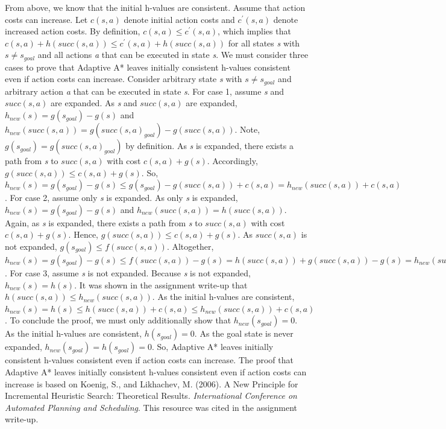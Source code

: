 \documentclass{article}
\begin{document}
From above, we know that the initial h-values are consistent. Assume that action costs can increase. Let $c(s,a)$ denote initial action costs and $c^{'}(s,a)$ denote increased action costs. By definition, $c(s,a) \leq c^{'}(s,a)$, which implies that $c(s,a) + h(succ(s,a)) \leq c^{'}(s,a) + h(succ(s,a))$ for all states \textit{s} with $s \neq s_{goal}$ and all actions \textit{a} that can be executed in state \textit{s}. We must consider three cases to prove that Adaptive A* leaves initially consistent h-values consistent even if action costs can increase. Consider arbitrary state \textit{s} with $s \neq s_{goal}$ and arbitrary action \textit{a} that can be executed in state \textit{s}. For case 1, assume \textit{s} and $succ(s,a)$ are expanded. As \textit{s} and $succ(s,a)$ are expanded, $h_{new}(s) = g(s_{goal}) - g(s)$ and $h_{new}(succ(s,a)) = g(succ(s,a)_{goal}) - g(succ(s,a))$. Note, $g(s_{goal}) = g(succ(s,a)_{goal})$ by definition. As \textit{s} is expanded, there exists a path from \textit{s} to $succ(s,a)$ with cost $c(s,a) + g(s)$. Accordingly, $g(succ(s,a)) \leq c(s,a) + g(s)$. So, $h_{new}(s) = g(s_{goal}) - g(s) \leq g(s_{goal}) - g(succ(s,a)) + c(s,a) = h_{new}(succ(s,a)) + c(s,a)$. For case 2, assume only \textit{s} is expanded. As only \textit{s} is expanded, $h_{new}(s) = g(s_{goal}) - g(s)$ and $h_{new}(succ(s,a)) = h(succ(s,a))$. Again, as \textit{s} is expanded, there exists a path from \textit{s} to $succ(s,a)$ with cost $c(s,a) + g(s)$. Hence, $g(succ(s,a)) \leq c(s,a) + g(s)$. As $succ(s,a)$ is not expanded, $g(s_{goal}) \leq f(succ(s,a))$. Altogether, $h_{new}(s) = g(s_{goal}) - g(s) \leq f(succ(s,a)) - g(s) = h(succ(s,a)) + g(succ(s,a)) - g(s) = h_{new}(succ(s,a)) + g(succ(s,a)) - g(s) \leq h_{new}(succ(s,a)) + g(succ(s,a)) - g(succ(s,a)) + c(s,a) = h_{new}(succ(s,a)) + c(s,a)$. For case 3, assume \textit{s} is not expanded. Because \textit{s} is not expanded, $h_{new}(s) = h(s)$. It was shown in the assignment write-up that $h(succ(s,a)) \leq h_{new}(succ(s,a))$. As the initial h-values are consistent, $h_{new}(s) = h(s) \leq h(succ(s,a)) + c(s,a) \leq h_{new}(succ(s,a)) + c(s,a)$. To conclude the proof, we must only additionally show that $h_{new}(s_{goal}) = 0$. As the initial h-values are consistent, $h(s_{goal}) = 0$. As the goal state is never expanded, $h_{new}(s_{goal}) = h(s_{goal}) = 0$. So, Adaptive A* leaves initially consistent h-values consistent even if action costs can increase.
\newline
\newline
\noindent
The proof that Adaptive A* leaves initially consistent h-values consistent even if action costs can increase is based on Koenig, S., and Likhachev, M. (2006). A New Principle for Incremental Heuristic Search: Theoretical Results. \textit{International Conference on Automated Planning and Scheduling}. This resource was cited in the assignment write-up. 
\end{document}
